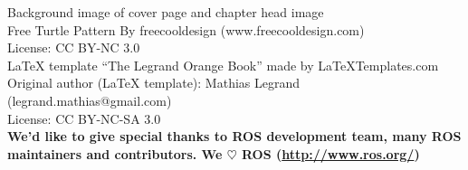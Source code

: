 \documentclass[11pt,fleqn]{book} %
\begin{document}
\noindent Background image of cover page and chapter head image\\
Free Turtle Pattern By freecooldesign (www.freecooldesign.com)\\
License: CC BY-NC 3.0\\

\noindent LaTeX template ``The Legrand Orange Book'' made by LaTeXTemplates.com\\
Original author (LaTeX template): Mathias Legrand (legrand.mathias@gmail.com)\\
License: CC BY-NC-SA 3.0\\

\noindent \textbf{We'd like to give special thanks to ROS development team, many ROS maintainers and contributors. We $\heartsuit$ ROS (\url{http://www.ros.org/})}

\newpage
\thispagestyle{empty}
\end{document}
